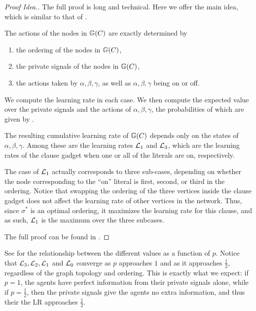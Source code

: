 \begin{proof}[Proof Idea.]
    The full proof is long and technical.
    Here we offer the main idea, which is similar to that of .

    The actions of the nodes in $ \mathbb{G}\!\left(C\right) $ are exactly determined by \begin{enumerate}[ ]
        \item the ordering of the nodes in $ \mathbb{G}\!\left(C\right) $,
        \item the private signals of the nodes in $ \mathbb{G}\!\left(C\right) $,
        \item the actions taken by $ \alpha, \beta, \gamma $, as well as $ \alpha, \beta, \gamma $ being on or off.
    \end{enumerate}
    We compute the learning rate in each case.
    We then compute the expected value over the private signals and the actions of $ \alpha,\beta,\gamma $, the probabilities of which are given by .

    The resulting cumulative learning rate of $ \mathbb{G}\!\left(C\right) $ depends only on the states of $ \alpha, \beta, \gamma $.
    Among these are the learning rates $ \mathcal{L}_1 $ and $ \mathcal{L}_3 $, which are the learning rates of the clause gadget when one or all of the literals are on, respectively.
     
    The case of $\mathcal{L}_1$ actually corresponds to three sub-cases, depending on whether the node corresponding to the ``on'' literal is first, second, or third in the ordering. Notice that swapping the ordering of the three vertices inside the clause gadget does not affect the learning rate of other vertices in the network. Thus, since $ \sigma^* $ is an optimal ordering, it maximizes the learning rate for this clause, and as such, $\mathcal{L}_1$ is the maximum over the three subcases.

    The full proof can be found in \appbayes.
\end{proof}

See  for the relationship between the different values as a function of $ p $.
Notice that $ \mathcal{L}_3,\mathcal{L}_2,\mathcal{L}_1$ and $\mathcal{L}_0 $ converge as $p$ approaches $1$ and as it approaches $\frac 12$, regardless of the graph topology and ordering.
This is exactly what we expect: if $ p=1 $, the agents have perfect information from their private signals alone, while if $ p=\frac 12 $, then the private signals give the agents no extra information, and thus their the LR approaches $ \frac 12 $.


